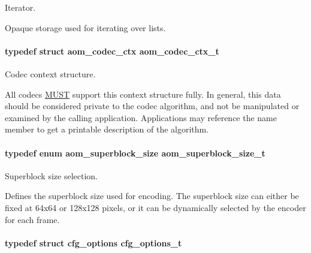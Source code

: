 Iterator. 

Opaque storage used for iterating over lists. 
\paragraph[{\texorpdfstring{aom\+\_\+codec\+\_\+ctx\+\_\+t}{aom_codec_ctx_t}}]{\setlength{\rightskip}{0pt plus 5cm}typedef struct {\bf aom\+\_\+codec\+\_\+ctx}  {\bf aom\+\_\+codec\+\_\+ctx\+\_\+t}}\hypertarget{group__codec_ga9a1d27f9742d9f70783e3c6cb849b5b4}{}\label{group__codec_ga9a1d27f9742d9f70783e3c6cb849b5b4}


Codec context structure. 

All codecs \hyperlink{rfc2119_MUST}{M\+U\+ST} support this context structure fully. In general, this data should be considered private to the codec algorithm, and not be manipulated or examined by the calling application. Applications may reference the \textquotesingle{}name\textquotesingle{} member to get a printable description of the algorithm. 
\paragraph[{\texorpdfstring{aom\+\_\+superblock\+\_\+size\+\_\+t}{aom_superblock_size_t}}]{\setlength{\rightskip}{0pt plus 5cm}typedef enum {\bf aom\+\_\+superblock\+\_\+size}  {\bf aom\+\_\+superblock\+\_\+size\+\_\+t}}\hypertarget{group__codec_ga8d0bf39eb86f047f1b2f6f1efe05a3ae}{}\label{group__codec_ga8d0bf39eb86f047f1b2f6f1efe05a3ae}


Superblock size selection. 

Defines the superblock size used for encoding. The superblock size can either be fixed at 64x64 or 128x128 pixels, or it can be dynamically selected by the encoder for each frame. 
\paragraph[{\texorpdfstring{cfg\+\_\+options\+\_\+t}{cfg_options_t}}]{\setlength{\rightskip}{0pt plus 5cm}typedef struct {\bf cfg\+\_\+options}  {\bf cfg\+\_\+options\+\_\+t}}\hypertarget{group__codec_ga58cddec4492c70945a2b4c3773c665b0}{}\label{group__codec_ga58cddec4492c70945a2b4c3773c665b0}


